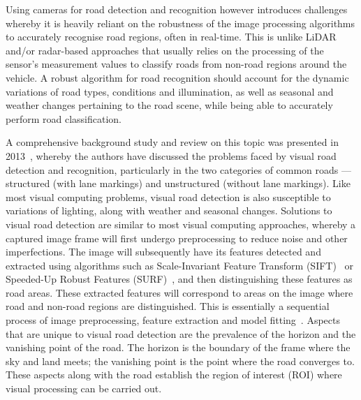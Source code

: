 Using cameras for road detection and recognition however introduces challenges whereby it is heavily reliant on the robustness of the image processing algorithms to accurately recognise road regions, often in real-time. This is unlike LiDAR and/or radar-based approaches that usually relies on the processing of the sensor's measurement values to classify roads from non-road regions around the vehicle. A robust algorithm for road recognition should account for the dynamic variations of road types, conditions and illumination, as well as seasonal and weather changes pertaining to the road scene, while being able to accurately perform road classification.  

A comprehensive background study and review on this topic was presented in 2013~\cite{sibel_yenikaya_keeping_2013}, whereby the authors have discussed the problems faced by visual road detection and recognition, particularly in the two categories of common roads --- structured (with lane markings) and unstructured (without lane markings). Like most visual computing problems, visual road detection is also susceptible to variations of lighting, along with weather and seasonal changes. Solutions to visual road detection are similar to most visual computing approaches, whereby a captured image frame will first undergo preprocessing to reduce noise and other imperfections. The image will subsequently have its features detected and extracted using algorithms such as Scale-Invariant Feature Transform (SIFT)~\cite{lowe_distinctive_2004} or Speeded-Up Robust Features (SURF)~\cite{bay_speeded-up_2008}, and then distinguishing these features as road areas. These extracted features will correspond to areas on the image where road and non-road regions are distinguished. This is essentially a sequential process of image preprocessing, feature extraction and model fitting~\cite{bar_hillel_recent_2014}. Aspects that are unique to visual road detection are the prevalence of the horizon and the vanishing point of the road. The horizon is the boundary of the frame where the sky and land meets; the vanishing point is the point where the road converges to. These aspects along with the road establish the region of interest (ROI) where visual processing can be carried out. 



